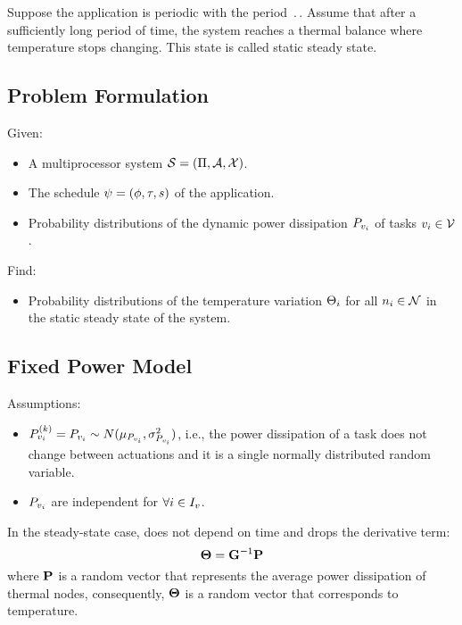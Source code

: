 Suppose the application is periodic with the period $\period$. Assume that after a sufficiently long period of time, the system reaches a thermal balance where temperature stops changing. This state is called static steady state.

\subsection{Problem Formulation}
Given:
\begin{itemize}
  \item A multiprocessor system $\mathcal{S} = (\Pi, \mathcal{A}, \mathcal{X})$.
  \item The schedule $\psi = (\phi, \tau, s)$ of the application.
  \item Probability distributions of the dynamic power dissipation $P_{v_i}$ of tasks $v_i \in \mathcal{V}$.
\end{itemize}

Find:
\begin{itemize}
  \item Probability distributions of the temperature variation $\Theta_i$ for all $n_i \in \mathcal{N}$ in the static steady state of the system.
\end{itemize}

\subsection{Fixed Power Model} 
Assumptions:
\begin{itemize}
  \item $P^{(k)}_{v_i} = P_{v_i} \sim N(\mu_{P_{v_i}}, \sigma_{P_{v_i}}^2)$, i.e., the power dissipation of a task does not change between actuations and it is a single normally distributed random variable.
  \item $P_{v_i}$ are independent for $\forall i \in I_v$.
\end{itemize}

In the steady-state case,  does not depend on time and drops the derivative term:
\begin{equation} \equlabel{steady-fourier}
  \vtemperature = \mconductance^{-1} \vpower
\end{equation}
where $\mathbf{P}$ is a random vector that represents the average power dissipation of thermal nodes, consequently, $\mathbf{\Theta}$ is a random vector that corresponds to temperature.

